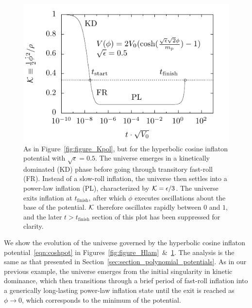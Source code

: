 \begin{figure}[tp]
  \includegraphics[width=\textwidth]{chapters/kinetic_dominance/figures/Klam}
  \caption{As in Figure~\protect\ref{fig:figure_Kpol}, but for the hyperbolic cosine inflaton potential with \(\sqrt{\epsilon}=0.5\). The universe emerges in a kinetically dominated (KD) phase before going through transitory fast-roll (FR). Instead of a slow-roll inflation, the universe then settles into a power-law inflation (PL), characterized by \(\mathcal{K}=\epsilon/3\). The universe exits inflation at \(t_\mathrm{finish}\), after which \(\phi\) executes oscillations about the base of the potential. \(\mathcal{K}\) therefore oscillates rapidly between \(0\) and \(1\), and the later \(t>t_\mathrm{finish}\) section of this plot has been suppressed for clarity.}\label{fig:figure_Klam}
\end{figure}

We show the evolution of the universe governed by the hyperbolic cosine inflaton potential~\eqref{eqn:coshpot} in Figures~\ref{fig:figure_Hlam}~\&~\ref{fig:figure_Klam}. The analysis is the same as that presented in Section~\ref{sec:section_polynomial_potentials}.  As in our previous example, the universe emerges from the initial singularity in kinetic dominance, which then transitions through a brief period of fast-roll inflation into a generically long-lasting power-law inflation state until the exit is reached as \(\phi\rightarrow0\), which corresponds to the minimum of the potential.  


